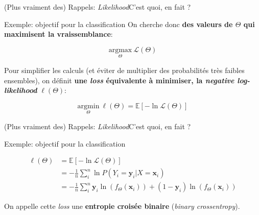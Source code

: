 \documentclass[12pt,dvipsnames,aspectratio=169]{beamer}
\newcommand{\x}[0]{\mathbf{x}}
\newcommand{\y}[0]{\mathbf{y}}
\begin{document}
\begin{frame}{(Plus vraiment des) Rappels: \textit{Likelihood}}{C'est quoi, en fait ?}

    \begin{exampleblock}{Exemple: objectif pour la classification}
        On cherche donc \textbf{des valeurs de $\Theta$ qui maximisent la vraissemblance}:

        $$\underset{\Theta}{\mathrm{argmax}} ~ \mathcal{L}(\Theta)$$

        Pour simplifier les calculs (et éviter de multiplier des probabilités très faibles ensembles), on définit \textbf{une \textit{loss} équivalente à minimiser, la \textit{negative log-likelihood}} $\ell(\Theta)$:

        $$\underset{\Theta}{\mathrm{argmin}} ~ \ell(\Theta) = \mathbb{E}[-\ln \mathcal{L}(\Theta)]$$

    \end{exampleblock}

\end{frame}

\begin{frame}{(Plus vraiment des) Rappels: \textit{Likelihood}}{C'est quoi, en fait ?}

    \begin{exampleblock}{Exemple: objectif pour la classification}

        \begin{align*}
            \ell(\Theta) &= \mathbb{E}[-\ln \mathcal{L}(\Theta)] \\
            &= - \frac{1}{n} \sum_i^n \ln P(Y_i=\y_i|X=\x_i) \\
            &= - \frac{1}{n} \sum_i^n \y_i\ln(f_\Theta(\x_i)) + (1-\y_i)\ln(f_\Theta(\x_i))
        \end{align*}

        On appelle cette \textit{loss} une \textbf{entropie croisée binaire} (\textit{binary crossentropy}).

    \end{exampleblock}

\end{frame}
\end{document}

